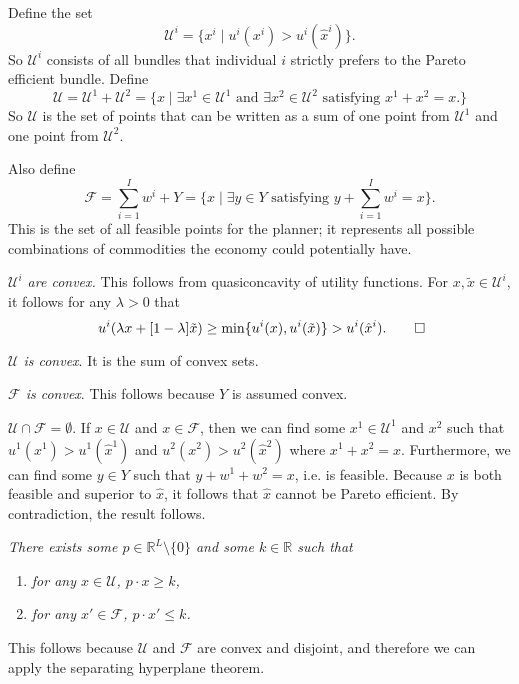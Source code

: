 \documentclass[12pt]{article}
\newcommand{\R}{\mathbb{R}}
\newcommand{\sumi}{\sum_{i=1}^I}
\theoremstyle{definition}
\begin{document}
Define the set 
	\[	\mathcal{U}^i  =\{ x^i \;|\; u^i(x^i) > u^i(\hat{x}^i)\} .\]
So $\mathcal{U}^i$ consists of all bundles that individual $i$ strictly prefers to the Pareto efficient bundle. Define 
	\[	\mathcal{U} = \mathcal{U}^1 + \mathcal{U}^2 = \{ x \;|\; \exists  x^1 \in \mathcal{U}^1 \text{ and } \exists x^2 \in \mathcal{U}^2 \text{ satisfying } x^1 + x^2 = x.\} \]
	So $\mathcal{U}$ is the set of points that can be written as a sum of one point from $\mathcal{U}^1$ and one point from $\mathcal{U}^2$. 

Also define 
	\[	\mathcal{F} = \sumi w^i + Y = \{ x \; | \; \exists y \in Y \text{ satisfying } y + \sumi w^i = x \}.	\]
This is the set of all feasible points for the planner; it represents all possible combinations of commodities the economy could potentially have. 


\begin{claim} \emph{	$\mathcal{U}^i$ are convex.} This follows from quasiconcavity of utility functions.  For $x, \tilde{x} \in \mathcal{U}^i$, it follows for any $\lambda >0$ that 
	\[	\ u^i( \lambda x + [1 - \lambda] \tilde{x} ) \geq \min \{ u^i(x), u^i(\tilde{x})\} > u^i(\hat{x}^i) . \qedhere \]
\end{claim}

\begin{claim}
	\emph{$\mathcal{U}$ is convex}. It is the sum of convex sets. 
\end{claim}

\begin{claim}
	\emph{$\mathcal{F}$ is convex}. This follows because $Y$ is assumed convex. 
\end{claim}

\begin{claim}
	$\mathcal{U} \cap \mathcal{F} = \emptyset$. If $x \in \mathcal{U}$ and $x \in \mathcal{F}$, then we can find some $x^1 \in \mathcal{U}^1$ and $x^2$ such that $u^1(x^1) > u^1(\hat{x}^1)$ and $u^2(x^2) > u^2(\hat{x}^2)$ where $x^1 + x^2 =x$. Furthermore, we can find some $y \in Y$ such that $y + w^1 + w^2 = x$, i.e. is feasible. Because $x$ is both feasible and superior to $\hat{x}$, it follows that $\hat{x}$ cannot be Pareto efficient. By contradiction, the result follows. 
\end{claim}

\begin{claim}
	\emph{There exists some $p \in \R^L \setminus \{0\}$ and some $k \in \R$ such that}
	\begin{enumerate}
		\item \emph{for any $x \in \mathcal{U}$, $p \cdot x \geq k$,}
		\item \emph{for any $x' \in \mathcal{F}$, $p \cdot x' \leq k$.}
	\end{enumerate}
	This follows because $ \mathcal{U}$ and $ \mathcal{F}$ are convex and disjoint, and therefore we can apply the separating hyperplane theorem. 
\end{claim}
\end{document}

